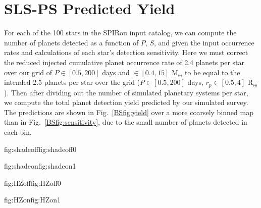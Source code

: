 \section{SLS-PS Predicted Yield} \label{BSsect:yield}
For each of the 100 stars in the SPIRou input catalog,
we can compute the number of planets detected as a function of $P$, $S$,
and \msini{} given the input occurrence rates and calculations of each star's detection sensitivity.
Here we must correct the reduced injected cumulative planet occurrence rate of 2.4 planets per star
over our grid of $P \in [0.5,200]$ days and \msini{} $\in [0.4,15]$ M$_{\oplus}$ to be equal to the
intended 2.5 planets per star over the \cite{dressing15a} grid ($P \in [0.5,200]$ days, $r_p \in [0.5,4]$
R$_{\oplus}$). Then after dividing out the number of simulated planetary systems per star,
we compute the total planet detection yield predicted by our
simulated survey. The predictions are shown in Fig.~\ref{BSfig:yield} over a more coarsely
binned map than in Fig.~\ref{BSfig:sensitivity}, due to the small number of planets detected in each
bin.

\begin{figure*}
  \centering
  \hspace{-\hsize}%
  \begin{ocg}{fig:shadeoff}{fig:shadeoff}{0}%
  \end{ocg}%
  \begin{ocg}{fig:shadeon}{fig:shadeon}{1}%
  \end{ocg}
  \hspace{-\hsize}%
  \begin{ocg}{fig:HZoff}{fig:HZoff}{0}%
  \end{ocg}%
  \begin{ocg}{fig:HZon}{fig:HZon}{1}%
  \end{ocg}
  \hspace{-\hsize}%
  \caption{Coarsely binned maps of the predicted planet yield from 
    the SLS-PS as a function of minimum planet mass and orbital period 
    (\emph{left}) or insolation (\emph{right}). The \emph{dashed vertical lines} in the
    insolation panel indicate the approximate `water-loss' and `maximum-greenhouse' insolation
    limits of the  from \cite{kopparapu13}.
    The \emph{dashed-dotted vertical lines}
    indicate the more conservative `recent-Venus' and `early-Mars' HZ limits \citep{kopparapu13}. The
     in each bin
    report the predicted number of detected planets and the uncertainties on the prediction
    which are dominated by uncertainties in the input planet occurrence rates.}
  \label{BSfig:yield}
\end{figure*}

